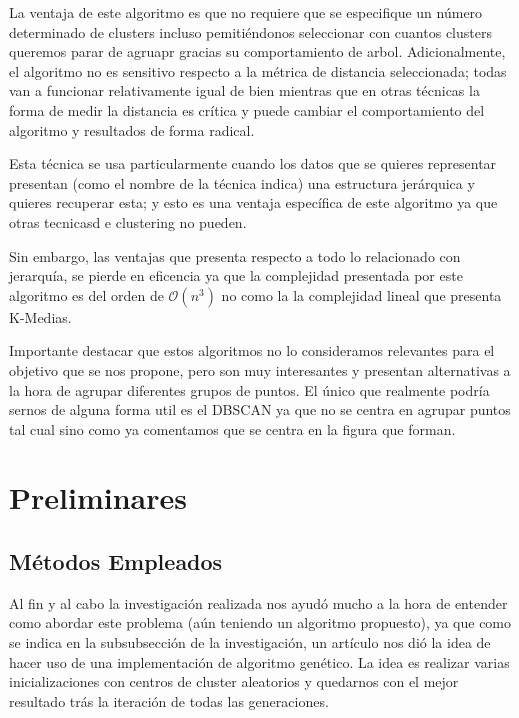 \documentclass[conference,a4paper]{IEEEtran}
\begin{document}
\clearpage
La ventaja de este algoritmo es que no requiere que se especifique un número determinado de clusters incluso pemitiéndonos seleccionar con cuantos clusters queremos parar de agruapr gracias  su comportamiento de arbol. Adicionalmente, el algoritmo no es sensitivo respecto a la métrica de distancia seleccionada; todas van a funcionar relativamente igual de bien mientras que en otras técnicas la forma de medir la distancia es crítica y puede cambiar el comportamiento del algoritmo y resultados de forma radical. 

Esta técnica se usa particularmente  cuando los datos que se quieres representar presentan (como el nombre de la técnica indica) una estructura jerárquica y quieres recuperar esta; y esto es una ventaja específica de este algoritmo ya que otras tecnicasd e clustering no pueden. 

Sin embargo, las ventajas que presenta respecto a todo lo relacionado con jerarquía, se pierde en eficencia ya que la complejidad presentada por este algoritmo es del orden de $\mathcal{O}(n^3)$ no como la la complejidad lineal que presenta K-Medias.

Importante destacar que estos algoritmos no lo consideramos relevantes para el objetivo que se nos propone, pero son muy interesantes y presentan alternativas a la hora de agrupar diferentes grupos de puntos. El único que realmente podría sernos de alguna forma util es el DBSCAN ya que no se centra en agrupar puntos tal cual sino como ya comentamos que se centra en la figura que forman.



\clearpage
\section{Preliminares}

\subsection{Métodos Empleados}

Al fin y al cabo la investigación realizada nos ayudó mucho a la hora de entender como abordar este problema (aún teniendo un algoritmo propuesto), ya que como se indica en la subsubsección de la investigación, un artículo nos dió la idea de hacer uso de una implementación de algoritmo genético. La idea es realizar varias inicializaciones con centros de cluster aleatorios y quedarnos con el mejor resultado trás la iteración de todas las generaciones.
\end{document}

